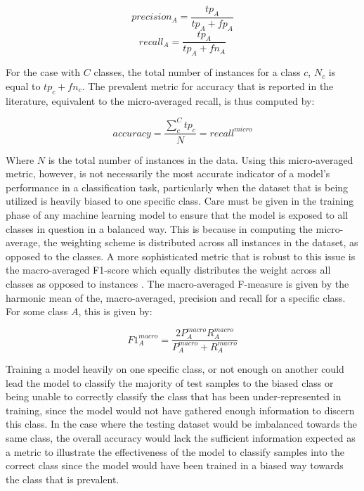 \documentclass[../../fyp.tex]{subfiles}
\begin{document}
\begin{equation} \label{eq:precision}
	precision_A = \frac{tp_A}{tp_A + fp_A}
\end{equation}
\begin{equation} \label{eq:recall}
	recall_A = \frac{tp_A}{tp_A + fn_A}
\end{equation}

For the case with $C$ classes, the total number of instances for a class $c$, $N_c$ is equal to $tp_c + fn_c$. The prevalent metric for accuracy that is reported in the literature, equivalent to the micro-averaged recall, is thus computed by:

\begin{equation} \label{eq:accuracy}
	accuracy = \frac{\sum_{c}^{C}tp_c}{N} = recall^{micro}
\end{equation}

Where $N$ is the total number of instances in the data. Using this micro-averaged metric, however, is not necessarily the most accurate indicator of a model's performance in a classification task, particularly when the dataset that is being utilized is heavily biased to one specific class. Care must be given in the training phase of any machine learning model to ensure that the model is exposed to all classes in question in a balanced way. This is because in computing the micro-average, the weighting scheme is distributed across all instances in the dataset, as opposed to the classes. A more sophisticated metric that is robust to this issue is the macro-averaged F1-score which equally distributes the weight across all classes as opposed to instances \cite{manning2010}. The macro-averaged F-measure is given by the harmonic mean of the, macro-averaged, precision and recall for a specific class. For some class $A$, this is given by:

\begin{equation} \label{eq:f1_measure}
	F1^{macro}_{A} = \frac{2P^{macro}_{A}R^{macro}_{A}}{P^{macro}_{A}+R^{macro}_{A}}
\end{equation}

Training a model heavily on one specific class, or not enough on another could lead the model to classify the majority of test samples to the biased class or being unable to correctly classify the class that has been under-represented in training, since the model would not have gathered enough information to discern this class. In the case where the testing dataset would be imbalanced towards the same class, the overall accuracy would lack the sufficient information expected as a metric to illustrate the effectiveness of the model to classify samples into the correct class since the model would have been trained in a biased way towards the class that is prevalent.
\end{document}
